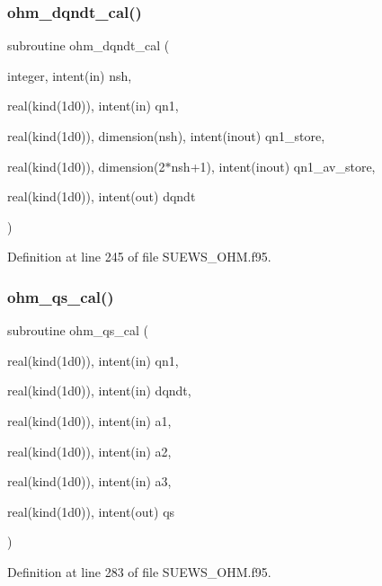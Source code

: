 \subsubsection{\texorpdfstring{ohm\+\_\+dqndt\+\_\+cal()}{ohm\_dqndt\_cal()}}
{\footnotesize\ttfamily subroutine ohm\+\_\+dqndt\+\_\+cal (\begin{DoxyParamCaption}\item[{integer, intent(in)}]{nsh,  }\item[{real(kind(1d0)), intent(in)}]{qn1,  }\item[{real(kind(1d0)), dimension(nsh), intent(inout)}]{qn1\+\_\+store,  }\item[{real(kind(1d0)), dimension(2$\ast$nsh+1), intent(inout)}]{qn1\+\_\+av\+\_\+store,  }\item[{real(kind(1d0)), intent(out)}]{dqndt }\end{DoxyParamCaption})}



Definition at line 245 of file S\+U\+E\+W\+S\+\_\+\+O\+H\+M.\+f95.

\mbox{\label{_s_u_e_w_s___o_h_m_8f95_a02a2622429b5a1d1ccc282269bc2aa0d}} 
\subsubsection{\texorpdfstring{ohm\+\_\+qs\+\_\+cal()}{ohm\_qs\_cal()}}
{\footnotesize\ttfamily subroutine ohm\+\_\+qs\+\_\+cal (\begin{DoxyParamCaption}\item[{real(kind(1d0)), intent(in)}]{qn1,  }\item[{real(kind(1d0)), intent(in)}]{dqndt,  }\item[{real(kind(1d0)), intent(in)}]{a1,  }\item[{real(kind(1d0)), intent(in)}]{a2,  }\item[{real(kind(1d0)), intent(in)}]{a3,  }\item[{real(kind(1d0)), intent(out)}]{qs }\end{DoxyParamCaption})}



Definition at line 283 of file S\+U\+E\+W\+S\+\_\+\+O\+H\+M.\+f95.

